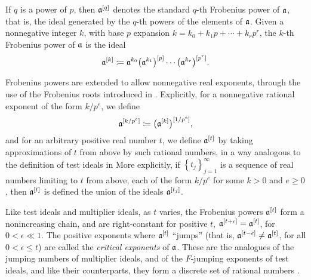 \documentclass{amsart}
\begin{document}
{

If $q$ is a power of $p$, then $\mathfrak{a}^{[q]}$ denotes the standard $q$-th Frobenius power of $\mathfrak{a}$, that is, the ideal generated by the $q$-th powers of the elements of $\mathfrak{a}$.
Given a nonnegative integer $k$, with base $p$ expansion $k = k_0 + k_1 p + \cdots + k_r p^r$, the $k$-th Frobenius power of $\mathfrak{a}$ is the ideal
\[\mathfrak{a}^{[k]} \coloneqq \mathfrak{a}^{k_0}\big(\mathfrak{a}^{k_1}\big)^{[p]}\cdots \big(\mathfrak{a}^{k_r}\big)^{[p^r]}.\]



Frobenius powers are extended to allow nonnegative real exponents, through the use of the Frobenius roots introduced in \cite{blickle+mustata+smith.discr_rat_FPTs}.
Explicitly, for a nonnegative rational exponent of the form $k/p^e$, we define
\[\mathfrak{a}^{[k/p^e]} \coloneqq \big(\mathfrak{a}^{[k]}\big)^{[1/p^e]},\]
and for an arbitrary positive real number $t$, we define $\mathfrak{a}^{[t]}$ by taking approximations of $t$ from above by such rational numbers, in a way analogous to the definition of test ideals in \loccit
More explicitly, if $\left\{t_j\right\}_{j=1}^\infty$ is a sequence of real numbers limiting to $t$ from above, each of the form $k/p^e$ for some $k>0$ and $e \geq 0$, then $\mathfrak{a}^{[t]}$ is defined the union of the ideals $\mathfrak{a}^{[t_j]}$.

Like test ideals and multiplier ideals, as $t$ varies, the Frobenius powers $\mathfrak{a}^{[t]}$ form a nonincreasing chain, and are right-constant for positive $t$, \ie $\mathfrak{a}^{[t+\epsilon]} = \mathfrak{a}^{[t]}$, for $0<\epsilon \ll 1$.
The positive exponents where $\mathfrak{a}^{[t]}$ ``jumps'' (that is, $\mathfrak{a}^{[t-\epsilon]}\ne \mathfrak{a}^{[t]}$, for all $0<\epsilon \le t$) are called the \emph{critical exponents} of $\mathfrak{a}$.
These are the analogues of the jumping numbers of multiplier ideals, and of the $F$-jumping exponents of test ideals, and like their counterparts, they form a discrete set of rational numbers \cite[Corollary~5.8]{hernandez+etal.frobenius_powers}.

}
\end{document}
